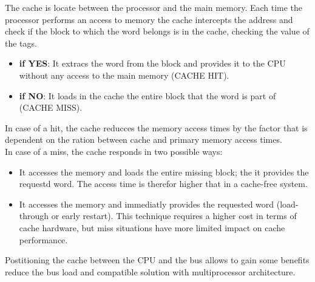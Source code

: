\documentclass[12pt]{article}
\begin{document}
The cache is locate between the processor and the main memory. Each time the processor performs an access to memory the cache intercepts the address and check if the block to which the word belongs is in the cache, checking the value of the tags.
\begin{itemize}
  \item \textbf{if YES}: It extracs the word from the block and provides it to the CPU without any access to the main memory (CACHE HIT).
  \item \textbf{if NO}: It loads in the cache the entire block that the word is part of (CACHE MISS).
\end{itemize}
In case of a hit, the cache reducces the memory access times by the factor that is dependent on the ration between cache and primary memory access times.\\
In case of a miss, the cache responds in two possible ways:
\begin{itemize}
  \item It accesses the memory and loads the entire missing block; the it provides the requestd word. The access time is therefor higher that in a cache-free system.
  \item It accesses the memory and immediatly provides the requested word (load-through or early restart). This technique requires a higher cost in terms of cache hardware, but miss situations have more limited impact on cache performance.
\end{itemize}
Postitioning the cache between the CPU and the bus allows to gain some benefits reduce the bus load and compatible solution with multiprocessor architecture.
\end{document}
